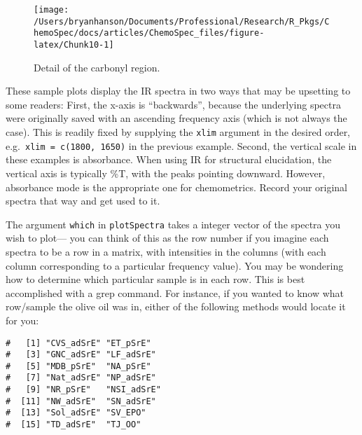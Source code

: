 \documentclass[letter,10pt,twocolumn,twoside,printwatermark=false]{pinp}
\begin{document}
\begin{figure}

{\centering \texttt{[image: /Users/bryanhanson/Documents/Professional/Research/R\_Pkgs/ChemoSpec/docs/articles/ChemoSpec\_files/figure-latex/Chunk10-1]} 

}

\caption{\label{subplot}Detail of the carbonyl region.}\label{fig:Chunk10}
\end{figure}

These sample plots display the IR spectra in two ways that may be
upsetting to some readers: First, the x-axis is ``backwards'', because
the underlying spectra were originally saved with an ascending frequency
axis (which is not always the case). This is readily fixed by supplying
the \texttt{xlim} argument in the desired order,
e.g.~\texttt{xlim = c(1800, 1650)} in the previous example. Second, the
vertical scale in these examples is absorbance. When using IR for
structural elucidation, the vertical axis is typically \%T, with the
peaks pointing downward. However, absorbance mode is the appropriate one
for chemometrics. Record your original spectra that way and get used to
it.

The argument \texttt{which} in \texttt{plotSpectra} takes a integer
vector of the spectra you wish to plot--- you can think of this as the
row number if you imagine each spectra to be a row in a matrix, with
intensities in the columns (with each column corresponding to a
particular frequency value). You may be wondering how to determine which
particular sample is in each row. This is best accomplished with a grep
command. For instance, if you wanted to know what row/sample the olive
oil was in, either of the following methods would locate it for you:

\begin{Shaded}
\begin{Highlighting}[]
\OperatorTok{$}
\end{Highlighting}
\end{Shaded}

\begin{ShadedResult}
\begin{verbatim}
#   [1] "CVS_adSrE" "ET_pSrE"  
#   [3] "GNC_adSrE" "LF_adSrE" 
#   [5] "MDB_pSrE"  "NA_pSrE"  
#   [7] "Nat_adSrE" "NP_adSrE" 
#   [9] "NR_pSrE"   "NSI_adSrE"
#  [11] "NW_adSrE"  "SN_adSrE" 
#  [13] "Sol_adSrE" "SV_EPO"   
#  [15] "TD_adSrE"  "TJ_OO"
\end{verbatim}
\end{ShadedResult}
\end{document}
